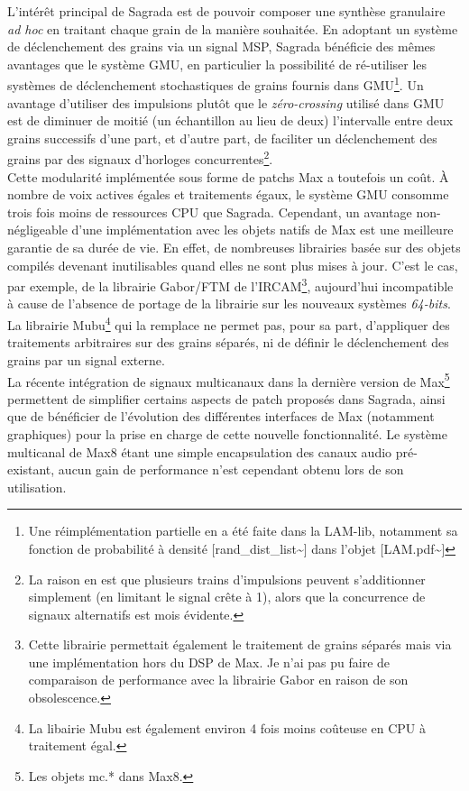 \noindent L'intérêt principal de Sagrada est de pouvoir composer une synthèse granulaire \textit{ad hoc} en traitant chaque grain de la manière souhaitée. En adoptant un système de déclenchement des grains via un signal \gls{MSP}, Sagrada bénéficie des mêmes avantages que le système \gls{GMU}, en particulier la possibilité de ré-utiliser les systèmes de déclenchement stochastiques de grains fournis dans \gls{GMU}\footnote{Une réimplémentation partielle en a été faite dans la LAM-lib, notamment sa fonction de probabilité à densité [rand\_dist\_list\textasciitilde{}] dans l'objet [LAM.pdf\textasciitilde{}]}. Un avantage d'utiliser des impulsions plutôt que le \textit{zéro-crossing} utilisé dans \gls{GMU} est de diminuer de moitié (un échantillon au lieu de deux) l'intervalle entre deux grains successifs d'une part, et d'autre part, de faciliter un déclenchement des grains par des signaux d'horloges concurrentes\footnote{La raison en est que plusieurs trains d'impulsions peuvent s'additionner simplement (en limitant le signal crête à 1), alors que la concurrence de signaux alternatifs est mois évidente.}.\\
\indent Cette modularité implémentée sous forme de patchs Max a toutefois un coût. À nombre de voix actives égales et traitements égaux, le système \gls{GMU} consomme trois fois moins de ressources \gls{CPU} que Sagrada. Cependant, un avantage non-négligeable d'une implémentation avec les objets natifs de Max est une meilleure garantie de sa durée de vie. En effet, de nombreuses librairies basée sur des objets compilés devenant inutilisables quand elles ne sont plus mises à jour. C'est le cas, par exemple, de la librairie Gabor/FTM de l'\gls{IRCAM}\footnote{Cette librairie permettait également le traitement de grains séparés mais via une implémentation hors du \gls{DSP} de Max. Je n'ai pas pu faire de comparaison de performance avec la librairie Gabor en raison de son obsolescence.}, aujourd'hui incompatible à cause de l'absence de portage de la librairie sur les nouveaux systèmes \textit{64-bits}. La librairie Mubu\footnote{La libairie Mubu est également environ 4 fois moins coûteuse en \gls{CPU} à traitement égal.} qui la remplace ne permet pas, pour sa part, d'appliquer des traitements arbitraires sur des grains séparés, ni de définir le déclenchement des grains par un signal externe.\\
\indent La récente intégration de signaux multicanaux dans la dernière version de Max\footnote{Les objets mc.* dans Max8.} permettent de simplifier certains aspects de patch proposés dans Sagrada, ainsi que de bénéficier de l'évolution des différentes interfaces de Max (notamment graphiques) pour la prise en charge de cette nouvelle fonctionnalité. Le système multicanal de Max8 étant une simple encapsulation des canaux audio pré-existant, aucun gain de performance n'est cependant obtenu lors de son utilisation.\\
